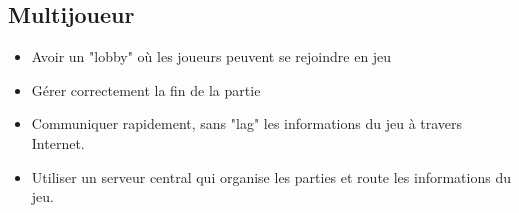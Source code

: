 \documentclass{article}
\begin{document}
\subsection{Multijoueur}
\begin{itemize}
  \item Avoir un "lobby" où les joueurs peuvent se rejoindre en jeu
  \item Gérer correctement la fin de la partie
  \item Communiquer rapidement, sans "lag" les informations du jeu à travers Internet.
  \item Utiliser un serveur central qui organise les parties et route les informations du jeu.
\end{itemize}



\end{document}
